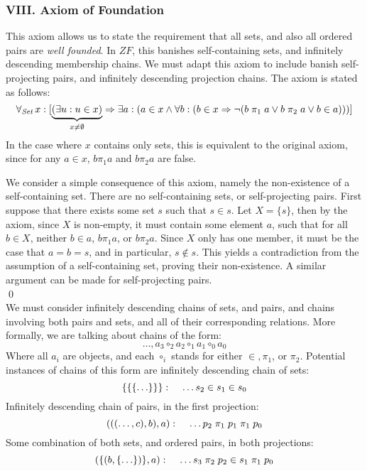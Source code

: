 \documentclass[11pt]{report}
\newcommand{\all}[1]{\forall_{\mathit{#1}}\hspace{0.5mm}}
\newcommand{\pleft}{\mathrel{\pi_1}}
\newcommand{\pright}{\mathrel{\pi_2}}
\theoremstyle{definition}
\theoremstyle{theorem}
\theoremstyle{lemma}
\begin{document}
\subsubsection*{VIII. Axiom of Foundation}
This axiom allows us to state the requirement that all sets, and also all ordered pairs are \emph{well founded}.
In $ZF$, this banishes self-containing sets, and infinitely descending membership chains.
We must adapt this axiom to include banish self-projecting pairs, and infinitely descending projection chains.
The axiom is stated as follows:
$$\all{Set} x: [\underbrace{(\exists u: u\in x)}_{x \neq \emptyset}
  \Rightarrow \exists a: (a\in x \wedge
               \forall b: (b\in x
               \Rightarrow \neg(b\pleft a \vee b\pright a \vee b\in a)))]
$$
In the case where $x$ contains only sets, this is equivalent to the original axiom, since for any $a\in x$, $b\pleft a$ and $b\pright a$ are false.

We consider a simple consequence of this axiom, namely the non-existence of a self-containing set.
\theorem There are no self-containing sets, or self-projecting pairs.
\proof First suppose that there exists some set $s$ such that $s\in s$.
Let $X = \{s\}$, then by the axiom, since $X$ is non-empty, it must contain some element $a$, such that for all $b\in X$, neither $b\in a$, $b\pleft a$, or $b\pright a$.
Since $X$ only has one member, it must be the case that $a=b=s$, and in particular, $s\notin s$.
This yields a contradiction from the assumption of a self-containing set, proving their non-existence.
A similar argument can be made for self-projecting pairs.\\
\qed \\

\noindent
We must consider infinitely descending chains of sets, and pairs, and chains involving both pairs and sets, and all of their corresponding relations.
More formally, we are talking about chains of the form:
$$\ldots, a_3 \mathrel{\circ_2} a_2 \mathrel{\circ_1} a_1 \mathrel{\circ_0} a_0$$
Where all $a_i$ are objects, and each $\circ_i$ stands for either $\in, \pleft$, or $\pright$. Potential instances of chains of this form are infinitely descending chain of sets:
  $$\{\{\{\ldots\}\}\}:\hspace{4mm}\ldots s_2 \in s_1 \in s_0$$
Infinitely descending chain of pairs, in the first projection:
  $$(((\ldots, c),b),a):\hspace{4mm}\ldots p_2 \pleft p_1 \pleft p_0$$
Some combination of both sets, and ordered pairs, in both projections:
  $$(\{(b, \{\ldots\})\}, a):\hspace{4mm}\ldots s_3 \pright p_2 \in s_1 \pleft p_0$$
\end{document}
